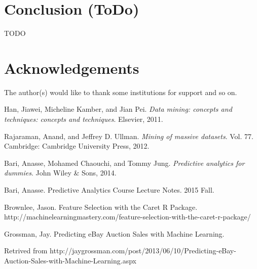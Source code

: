 \documentclass[CEJM,PDF]{cej} %
\begin{document}
\section{Conclusion (ToDo)}
TODO


\section*{Acknowledgements}

The author(s) would like to thank some institutions for support and so on.


\begin{thebibliography}{9}

Han, Jiawei, Micheline Kamber, and Jian Pei.\textit{ Data mining: concepts and techniques: concepts and techniques}. Elsevier, 2011.

 Rajaraman, Anand, and Jeffrey D. Ullman. \textit{Mining of massive datasets}. Vol. 77. Cambridge: Cambridge University Press, 2012.

 Bari, Anasse, Mohamed Chaouchi, and Tommy Jung. \textit{Predictive analytics for dummies}. John Wiley \& Sons, 2014.	

 Bari, Anasse. Predictive Analytics Course Lecture Notes. 2015 Fall.

  Brownlee, Jason. Feature Selection with the Caret R Package. http://machinelearningmastery.com/feature-selection-with-the-caret-r-package/

 Grossman, Jay. Predicting eBay Auction Sales with Machine Learning.

Retrived from http://jaygrossman.com/post/2013/06/10/Predicting-eBay-Auction-Sales-with-Machine-Learning.aspx


\end{thebibliography}
\end{document}
